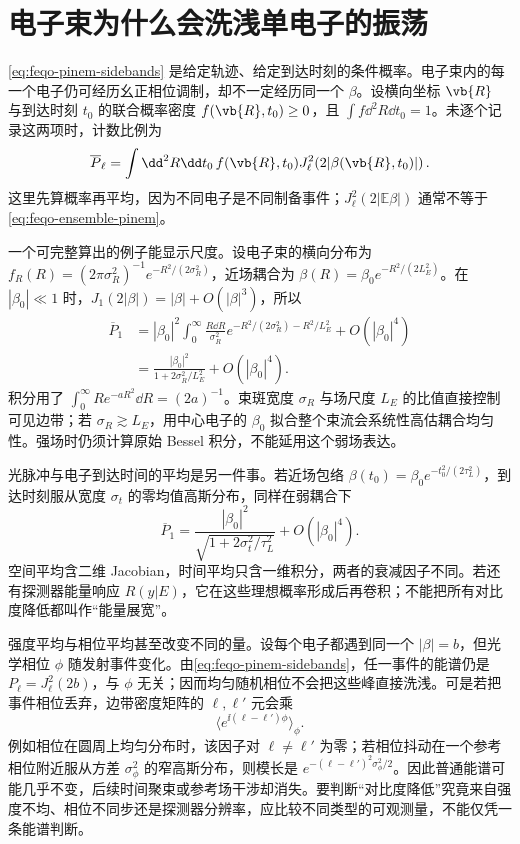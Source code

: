 \section{电子束为什么会洗浅单电子的振荡}
\label{chap:feqo-averaging}

\cref{eq:feqo-pinem-sidebands} 是给定轨迹、给定到达时刻的条件概率。电子束内的每一个电子仍可经历幺正相位调制，却不一定经历同一个 \(\beta\)。设横向坐标 \(\vb{R}\) 与到达时刻 \(t_0\) 的联合概率密度 \(f(\vb{R},t_0)\geq0\)，且 \(\int f\dd^2R\dd t_0=1\)。未逐个记录这两项时，计数比例为
\begin{equation}
\overline P_\ell=\int\dd^2R\dd t_0\,f(\vb{R},t_0)
J_\ell^2\!\left(2|\beta(\vb{R},t_0)|\right).
\label{eq:feqo-ensemble-pinem}
\end{equation}
这里先算概率再平均，因为不同电子是不同制备事件；\(J_\ell^2(2|\mathbb E\beta|)\) 通常不等于\cref{eq:feqo-ensemble-pinem}。

一个可完整算出的例子能显示尺度。设电子束的横向分布为 \(f_R(R)=(2\pi\sigma_R^2)^{-1}e^{-R^2/(2\sigma_R^2)}\)，近场耦合为 \(\beta(R)=\beta_0e^{-R^2/(2L_E^2)}\)。在 \(|\beta_0|\ll1\) 时，\(J_1(2|\beta|)=|\beta|+O(|\beta|^3)\)，所以
\begin{align*}
\overline P_1
&=|\beta_0|^2\int_0^\infty\frac{R\dd R}{\sigma_R^2}
e^{-R^2/(2\sigma_R^2)-R^2/L_E^2}+O(|\beta_0|^4)\\
&=\frac{|\beta_0|^2}{1+2\sigma_R^2/L_E^2}+O(|\beta_0|^4).
\end{align*}
积分用了 \(\int_0^\infty Re^{-aR^2}\dd R=(2a)^{-1}\)。束斑宽度 \(\sigma_R\) 与场尺度 \(L_E\) 的比值直接控制可见边带；若 \(\sigma_R\gtrsim L_E\)，用中心电子的 \(\beta_0\) 拟合整个束流会系统性高估耦合均匀性。强场时仍须计算原始 Bessel 积分，不能延用这个弱场表达。

光脉冲与电子到达时间的平均是另一件事。若近场包络 \(\beta(t_0)=\beta_0e^{-t_0^2/(2\tau_L^2)}\)，到达时刻服从宽度 \(\sigma_t\) 的零均值高斯分布，同样在弱耦合下
\[
\overline P_1=\frac{|\beta_0|^2}{\sqrt{1+2\sigma_t^2/\tau_L^2}}+O(|\beta_0|^4).
\]
空间平均含二维 Jacobian，时间平均只含一维积分，两者的衰减因子不同。若还有探测器能量响应 \(R(y|E)\)，它在这些理想概率形成后再卷积；不能把所有对比度降低都叫作“能量展宽”。

强度平均与相位平均甚至改变不同的量。设每个电子都遇到同一个 \(|\beta|=b\)，但光学相位 \(\phi\) 随发射事件变化。由\cref{eq:feqo-pinem-sidebands}，任一事件的能谱仍是 \(P_\ell=J_\ell^2(2b)\)，与 \(\phi\) 无关；因而均匀随机相位不会把这些峰直接洗浅。可是若把事件相位丢弃，边带密度矩阵的 \(\ell,\ell'\) 元会乘
\[
\langle e^{\ii(\ell-\ell')\phi}\rangle_\phi.
\]
例如相位在圆周上均匀分布时，该因子对 \(\ell\ne\ell'\) 为零；若相位抖动在一个参考相位附近服从方差 \(\sigma_\phi^2\) 的窄高斯分布，则模长是 \(e^{-(\ell-\ell')^2\sigma_\phi^2/2}\)。因此普通能谱可能几乎不变，后续时间聚束或参考场干涉却消失。要判断“对比度降低”究竟来自强度不均、相位不同步还是探测器分辨率，应比较不同类型的可观测量，不能仅凭一条能谱判断。

